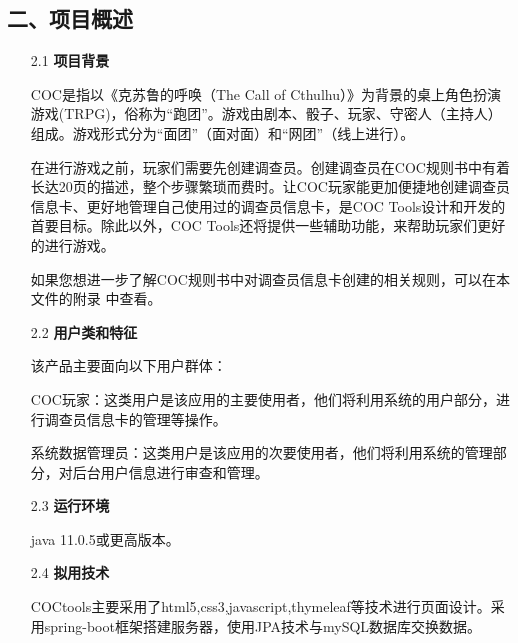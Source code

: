 \documentclass[a4paper,UTF8]{article}
\theoremstyle{definition}
\begin{document}
\begin{CJK}{UTF8}{gkai}
\begin{flushleft}
\begin{CJK*}{UTF8}{gbsn}
\section*{二、项目概述}
\end{CJK*}
\end{flushleft}
\begin{enumerate}
	\item[2.1] \textbf{项目背景}
	\par COC是指以《克苏鲁的呼唤（The Call of Cthulhu）》为背景的桌上角色扮演游戏(TRPG)，俗称为“跑团”。游戏由剧本、骰子、玩家、守密人（主持人）组成。游戏形式分为“面团”（面对面）和“网团”（线上进行）。
	\par 在进行游戏之前，玩家们需要先创建调查员。创建调查员在COC规则书中有着长达20页的描述，整个步骤繁琐而费时。让COC玩家能更加便捷地创建调查员信息卡、更好地管理自己使用过的调查员信息卡，是COC Tools设计和开发的首要目标。除此以外，COC Tools还将提供一些辅助功能，来帮助玩家们更好的进行游戏。
	\par 如果您想进一步了解COC规则书中对调查员信息卡创建的相关规则，可以在本文件的附录
中查看。
	\item[2.2] \textbf{用户类和特征}
	\par 该产品主要面向以下用户群体：
	\par COC玩家：这类用户是该应用的主要使用者，他们将利用系统的用户部分，进行调查员信息卡的管理等操作。
	\par 系统数据管理员：这类用户是该应用的次要使用者，他们将利用系统的管理部分，对后台用户信息进行审查和管理。
	\item[2.3] \textbf{运行环境}
	\par java 11.0.5或更高版本。
	\item[2.4] \textbf{拟用技术}
	\par COCtools主要采用了html5,css3,javascript,thymeleaf等技术进行页面设计。采用spring-boot框架搭建服务器，使用JPA技术与mySQL数据库交换数据。
\end{enumerate}

\begin{flushleft}
\begin{CJK*}{UTF8}{gbsn}

\end{CJK*}
\end{flushleft}
\end{CJK}
\end{document}
